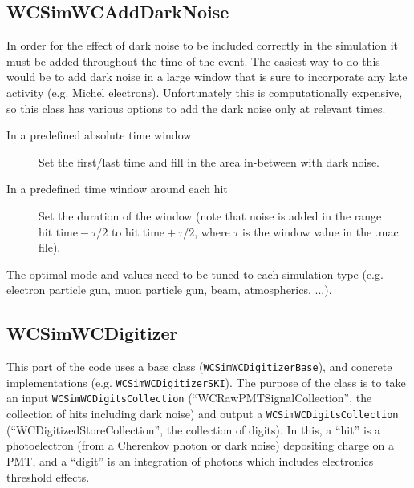 \subsection{WCSimWCAddDarkNoise}
\label{sec:daq:darknoise}

In order for the effect of dark noise to be included correctly in the simulation it must be added throughout the time of the event. The easiest way to do this would be to add dark noise in a large window that is sure to incorporate any late activity (e.g. Michel electrons). Unfortunately this is computationally expensive, so this class has various options to add the dark noise only at relevant times.
\begin{description}
\item[In a predefined absolute time window] Set the first/last time and fill in the area in-between with dark noise.
\item[In a predefined time window around each hit] Set the duration of the window (note that noise is added in the range $\textrm{hit time} - \tau/2$ to $\textrm{hit time} + \tau/2$, where $\tau$ is the window value in the .mac file).
\end{description}
The optimal mode and values need to be tuned to each simulation type (e.g. electron particle gun, muon particle gun, beam, atmospherics, ...).

\subsection{WCSimWCDigitizer}
\label{sec:daq:digitizer}

This part of the code uses a base class (\texttt{WCSimWCDigitizerBase}), and concrete implementations (e.g. \texttt{WCSimWCDigitizerSKI}). The purpose of the class is to take an input \texttt{WCSimWCDigitsCollection} (``WCRawPMTSignalCollection'', the collection of hits including dark noise) and output a \texttt{WCSimWCDigitsCollection} (``WCDigitizedStoreCollection'', the collection of digits). In this, a ``hit'' is a photoelectron (from a Cherenkov photon or dark noise) depositing charge on a PMT, and  a ``digit'' is an integration of photons which includes electronics threshold effects.

